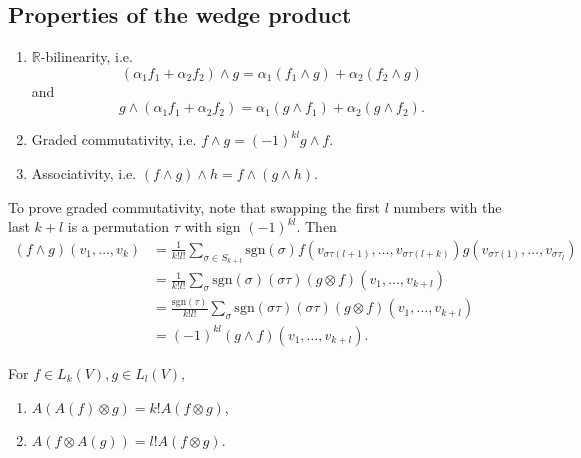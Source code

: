 \subsection{Properties of the wedge product}
\begin{enumerate}
  \item{
    $\mathbb{R}$-bilinearity, i.e.
    $$
      (\alpha_1 f_1 + \alpha_2 f_2)  \wedge g
    = \alpha_1 (f_1 \wedge g) + \alpha_2 (f_2 \wedge g)
    $$
    and
    $$
      g \wedge (\alpha_1 f_1 + \alpha_2 f_2)
    = \alpha_1 (g \wedge f_1) + \alpha_2 (g \wedge f_2).
    $$
  }
  \item{
    Graded commutativity, i.e.
    $f \wedge g = (-1)^{kl} g \wedge f$.
  }
  \item{
    Associativity, i.e.
    $(f \wedge g) \wedge h = f \wedge (g \wedge h)$.
  }
\end{enumerate}

To prove graded commutativity, note that swapping the first $l$
numbers with the last $k + l$ is a permutation $\tau$ with sign
$(-1)^{kl}$. Then
\begin{align*}
   (f \wedge g)(v_1, \dots, v_k)
&= \frac{1}{k! l!}
   \sum_{\sigma \in S_{k + l}}
     \mathrm{sgn}(\sigma)
     f(v_{\sigma \tau(l + 1)}, \dots, v_{\sigma \tau(l + k)})
     g(v_{\sigma \tau (1)}, \dots, v_{\sigma \tau_{l}}) \\
&= \frac{1}{k! l!}
   \sum_{\sigma}
     \mathrm{sgn}(\sigma)
     (\sigma \tau)
       (g \otimes f)
         (v_{1}, \dots, v_{k + l}) \\
&= \frac{\mathrm{sgn}(\tau)}
        {k! l!}
   \sum_\sigma
     \mathrm{sgn}(\sigma \tau)
     (\sigma \tau)
       (g \otimes f)
         (v_1, \dots, v_{k+l}) \\
&= (-1)^{kl} (g \wedge f) (v_1, \dots, v_{k+l}).
\end{align*}

\begin{lemma}
For $f \in L_k(V), g \in L_l(V)$,
\begin{enumerate}
  \item{
    $A(A(f) \otimes g) = k! A(f \otimes g)$,
  }
  \item{
    $A(f \otimes A(g)) = l! A(f \otimes g)$.
  }
\end{enumerate}
\end{lemma}

